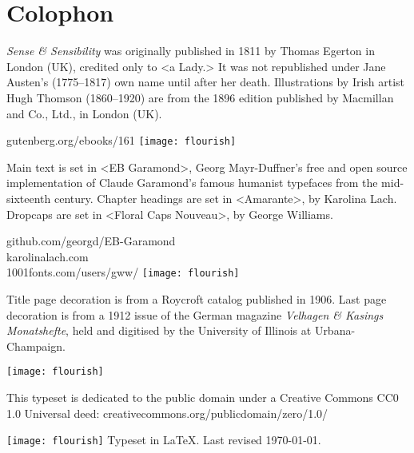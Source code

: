 \documentclass[
paper=5.5in:8.5in,
]{scrbook}
\begin{document}
{}
\chapter*{Colophon}

\centering
\vfill
\begin{minipage}{\textwidth}
\textit{Sense \& Sensibility} was originally published in 1811 by Thomas Egerton in London (UK), credited only to <a Lady.> It was not republished under Jane Austen's (1775--1817) own name until after her death. Illustrations by Irish artist Hugh Thomson (1860--1920) are from the 1896 edition published by Macmillan and Co., Ltd., in London (UK).
\end{minipage}
\vfill
gutenberg.org/ebooks/161
\vfill
\texttt{[image: flourish]}
\vfill
\begin{minipage}{\textwidth}
Main text is set in <EB Garamond>, Georg Mayr-Duffner's free and open source implementation of Claude Garamond’s famous humanist typefaces from the mid-sixteenth century. Chapter headings are set in <Amarante>, by Karolina Lach. Dropcaps are set in <Floral Caps Nouveau>, by George Williams. 
\end{minipage} 
\vfill
github.com/georgd/EB-Garamond\\
karolinalach.com\\
1001fonts.com/users/gww/
\vfill
\texttt{[image: flourish]}
\vfill
\begin{minipage}{\textwidth}
Title page decoration is from a Roycroft catalog published in 1906. Last page decoration is from a 1912 issue of the German magazine \textit{Velhagen \& Kasings Monatshefte}, held and digitised by the University of Illinois at Urbana-Champaign.
\end{minipage}
\vfill
\texttt{[image: flourish]}
\vfill
\begin{minipage}{\textwidth}
This typeset is dedicated to the public domain under a Creative Commons CC0 1.0 Universal deed: creativecommons.org/publicdomain/zero/1.0/
\end{minipage}
\vfill
\texttt{[image: flourish]}
\vfill
Typeset in \LaTeX{}. Last revised \today.
\thispagestyle{empty}
\end{document}
